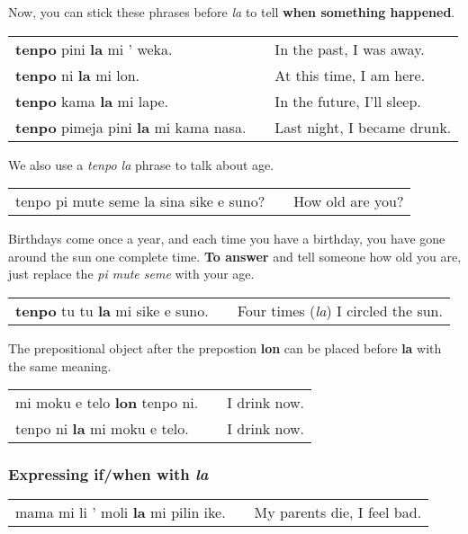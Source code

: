 Now, you can stick these phrases before \textit{la} to tell \textbf{when something happened}. 

\begin{supertabular}{p{5,5cm}|ll}
\textbf{tenpo} pini \textbf{la} mi ' weka. && In the past, I was away. \\
\textbf{tenpo} ni \textbf{la} mi lon. && At this time, I am here. \\
\textbf{tenpo} kama \textbf{la} mi lape. && In the future, I'll sleep. \\
\textbf{tenpo} pimeja pini \textbf{la} mi kama nasa. && Last night, I became drunk. \\
\end{supertabular} 

We also use a \textit{tenpo la} phrase to talk about age. 

\begin{supertabular}{p{5,5cm}|ll}
tenpo pi mute seme la sina sike e suno? && How old are you? \\
\end{supertabular} 

Birthdays come once a year, and each time you have a birthday, you have gone around the sun one complete time. 
\textbf{To answer} and tell someone how old you are, just replace the \textit{pi mute seme} with your age.

\begin{supertabular}{p{5,5cm}|ll}
\textbf{tenpo} tu tu \textbf{la} mi sike e suno. && Four times (\textit{la}) I circled the sun. \\
\end{supertabular} 

The prepositional object after the prepostion \textbf{lon} can be placed before \textbf{la} with the same meaning.

\begin{supertabular}{p{5,5cm}|ll}
mi moku e telo \textbf{lon} tenpo ni. && I drink now. \\
tenpo ni \textbf{la} mi moku e telo.  && I drink now. \\
\end{supertabular} 
%
\subsubsection*{Expressing if/when with \textit{la}}
%
\begin{supertabular}{p{5,5cm}|ll}
mama mi li ' moli \textbf{la} mi pilin ike. && My parents die, I feel bad. \\
\end{supertabular} 

